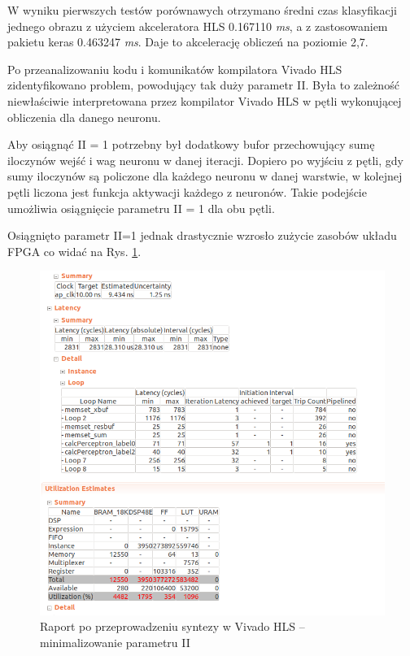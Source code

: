 W wyniku pierwszych testów porównawych otrzymano średni czas klasyfikacji jednego obrazu z użyciem akceleratora HLS 
0.167110 \emph{ms}, a z zastosowaniem pakietu keras 0.463247 \emph{ms}. Daje to akcelerację obliczeń na 
poziomie 2,7.

Po przeanalizowaniu kodu i komunikatów kompilatora Vivado HLS zidentyfikowano problem, powodujący tak duży parametr II. Była to zależność niewłaściwie interpretowana przez kompilator Vivado HLS w pętli wykonującej obliczenia dla danego neuronu.

Aby osiągnąć II = 1 potrzebny był dodatkowy bufor przechowujący sumę iloczynów wejść i wag neuronu w danej iteracji. Dopiero po wyjściu z pętli, gdy sumy iloczynów są policzone dla każdego neuronu w danej warstwie, w kolejnej pętli liczona jest funkcja aktywacji każdego z neuronów. Takie podejście umożliwia osiągnięcie parametru II = 1 dla obu pętli.

Osiągnięto parametr II=1 jednak drastycznie wzrosło zużycie zasobów układu FPGA co widać na Rys. \ref{hls-report3}.

\begin{figure}[!h]
  \centering
  \includegraphics[width=\textwidth]{img/hls-report3.png}
  \caption{Raport po przeprowadzeniu syntezy w Vivado HLS -- minimalizowanie parametru II}
  \label{hls-report3}
\end{figure}

